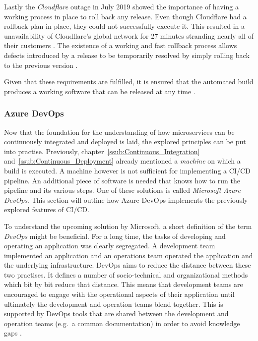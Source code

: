 Lastly the \textit{Cloudflare} outage in July 2019 showed the importance of
having a working process in place to roll back any release. Even though
Cloudflare had a rollback plan in place, they could not successfully execute
it. This resulted in a unavailability of Cloudflare's global network for 27
minutes stranding nearly all of their customers
\autocite{Graham-CummingDetailsCloudflareoutage2019}. The existence of a
working and fast rollback process allows defects introduced by a release to be
temporarily resolved by simply rolling back to the previous version
\autocite[p. 199]{MatyasContinuousIntegration2007}.

Given that these requirements are fulfilled, it is ensured that the automated
build produces a working software that can be released at any time \autocite[p.
200]{MatyasContinuousIntegration2007}.

\subsubsection{Azure DevOps}%
\label{ssub:Azure_DevOps}
Now that the foundation for the understanding of how microservices can be
continuously integrated and deployed is laid, the explored principles can be
put into practise. Previously, chapter~\ref{ssub:Continuous_Integration}
and~\ref{ssub:Continuous_Deployment} already mentioned a \textit{machine} on
which a build is executed. A machine however is not sufficient for implementing
a \ac{CI}/\ac{CD} pipeline. An additional piece of software is needed that
knows how to run the pipeline and its various steps. One of these solutions is
called \textit{Microsoft Azure DevOps}. This section will outline how Azure
DevOps implements the previously explored features of \ac{CI}/\ac{CD}.

To understand the upcoming solution by Microsoft, a short definition of the
term \textit{DevOps} might be beneficial. For a long time, the tasks of
developing and operating an application was clearly segregated. A development
team implemented an application and an operations team operated the application
and the underlying infrastructure. DevOps aims to reduce the distance between
these two practises. It defines a number of socio-technical and organizational
methods which bit by bit reduce that distance. This means that development
teams are encouraged to engage with the operational aspects of their
application until ultimately the development and operation teams blend
together. This is supported by DevOps tools that are shared between the
development and operation teams (e.g.\ a common documentation) in order to
avoid knowledge gaps \autocite{ArtacDevOpsIntroducingInfrastructure2017}.

